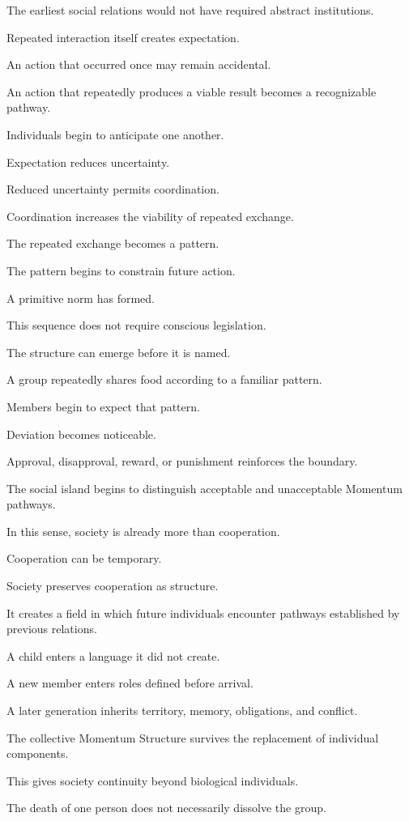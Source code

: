 The earliest social relations would not have required abstract institutions.

Repeated interaction itself creates expectation.

An action that occurred once may remain accidental.

An action that repeatedly produces a viable result becomes a recognizable pathway.

Individuals begin to anticipate one another.

Expectation reduces uncertainty.

Reduced uncertainty permits coordination.

Coordination increases the viability of repeated exchange.

The repeated exchange becomes a pattern.

The pattern begins to constrain future action.

A primitive norm has formed.

This sequence does not require conscious legislation.

The structure can emerge before it is named.

A group repeatedly shares food according to a familiar pattern.

Members begin to expect that pattern.

Deviation becomes noticeable.

Approval, disapproval, reward, or punishment reinforces the boundary.

The social island begins to distinguish acceptable and unacceptable Momentum pathways.

In this sense, society is already more than cooperation.

Cooperation can be temporary.

Society preserves cooperation as structure.

It creates a field in which future individuals encounter pathways established by previous relations.

A child enters a language it did not create.

A new member enters roles defined before arrival.

A later generation inherits territory, memory, obligations, and conflict.

The collective Momentum Structure survives the replacement of individual components.

This gives society continuity beyond biological individuals.

The death of one person does not necessarily dissolve the group.

